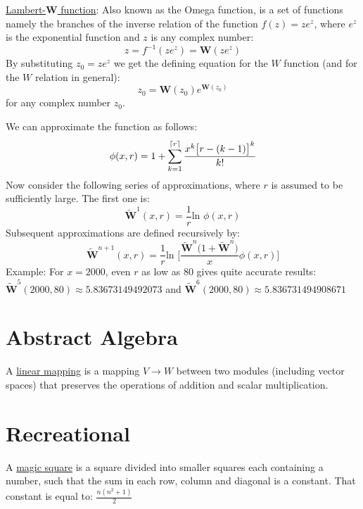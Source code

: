\documentclass[12pt]{article}
\def\ln{\text{ln\ }} %
\DeclarePairedDelimiter{\ceil}{\lceil}{\rceil} %
\begin{document}
\begin{flushleft}
	\textbullet \quad \uline{Lambert-$\mathbf{W}$ function}: \linebreak 
	Also known as the Omega function, is a set of functions namely the branches of the inverse relation of the function $ f(z) = ze^z $, where $e^z$ is the exponential function and $z$ is any complex number: \linebreak 
	$$ z = f^{-1} (ze^z) = \mathbf{W}(ze^z) $$
	By substituting $z_0 = ze^z $ we get the defining equation for the $W$ function (and for the $W$ relation in general): \linebreak 
	$$ z_0 = \mathbf{W}(z_0)e^{\mathbf{W}(z_0)} $$
	for any complex number $z_0$. \linebreak 
	
	We can approximate the function as follows: \linebreak 
	$$ \phi(x,r) = 1 + \sum \limits_{k=1}^{\ceil{r}} \frac{x^k \big[ r - (k-1) \big]^k}{k!} $$
	Now consider the following series of approximations, where $r$ is assumed to be sufficiently large. The first one is: \linebreak 
	$$ \mathbf{\tilde{W}}^1 (x,r) = \frac{1}{r} \ln \phi (x,r) $$
	Subsequent approximations are defined recursively by: \linebreak 
	$$ \mathbf{\tilde{W}}^{n+1} (x,r) = \frac{1}{r} \ln \Bigg[ \frac{\mathbf{\tilde{W}}^n \big(1 + \mathbf{\tilde{W}}^n \big)}{x} \phi (x,r) \Bigg] $$
	Example: For $x = 2000$, even $r$ as low as $80$ gives quite accurate results: \linebreak 
	$ \mathbf{\tilde{W}}^5 (2000,80) \approx 5.83673149492073 $ and $ \mathbf{\tilde{W}}^6 (2000,80) \approx 5.836731494908671 $
	
	
	\pagebreak
	
	
	\section{Abstract Algebra} 
	
	\textbullet \quad A \uline{linear mapping} is a mapping $V \rightarrow W$ between two modules (including vector spaces) that preserves the operations of addition and scalar multiplication. \linebreak 
	
	
	\pagebreak
	
	
	\section{Recreational}

	A \uline{magic square} is a square divided into smaller squares each containing a number, such that the sum in each row, column and diagonal is a constant. That constant is equal to: \linebreak 
	$ \frac{n (n^2 + 1)}{2} $
	

\end{flushleft}
\end{document}

